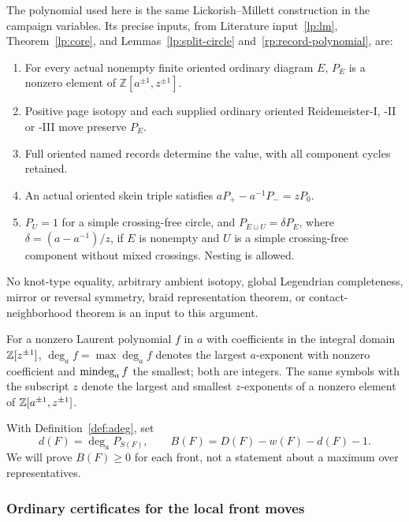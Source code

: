 The polynomial used here is the same Lickorish--Millett construction in
the campaign variables. Its precise inputs, from
Literature input~\ref{lp:lm}, Theorem~\ref{lp:core}, and
Lemmas~\ref{lp:split-circle} and~\ref{rp:record-polynomial}, are:
\begin{enumerate}
\item For every actual nonempty finite oriented ordinary diagram $E$,
  $P_E$ is a nonzero element of $\mathbb Z[a^{\pm1},z^{\pm1}]$.
\item Positive page isotopy and each supplied ordinary oriented
  Reidemeister-I, -II or -III move preserve $P_E$.
\item Full oriented named records determine the value, with all component
  cycles retained.
\item An actual oriented skein triple satisfies
  $aP_+-a^{-1}P_-=zP_0$.
\item $P_U=1$ for a simple crossing-free circle, and
  $P_{E\sqcup U}=\delta P_E$, where
  $\delta=(a-a^{-1})/z$, if $E$ is nonempty and $U$ is a simple
  crossing-free component without mixed crossings. Nesting is allowed.
\end{enumerate}
No knot-type equality, arbitrary ambient isotopy, global Legendrian
completeness, mirror or reversal symmetry, braid representation theorem,
or contact-neighborhood theorem is an input to this argument.

\begin{definition}[degrees in $a$]\label{def:adeg}
For a nonzero Laurent polynomial $f$ in $a$ with coefficients in the
integral domain $\mathbb Z[z^{\pm1}]$, $\deg_af=\max\deg_af$ denotes the largest
$a$-exponent with nonzero coefficient and $\operatorname{mindeg}_af$ the smallest; both
are integers. The same symbols with the subscript $z$ denote the largest and
smallest $z$-exponents of a nonzero element of $\mathbb Z[a^{\pm1},z^{\pm1}]$.
\end{definition}

With Definition~\ref{def:adeg}, set
\begin{equation}\label{ng:defect}
 d(F)=\deg_a P_{S(F)},\qquad
 B(F)=D(F)-w(F)-d(F)-1.
\end{equation}
We will prove $B(F)\geq0$ for each front, not a statement about a maximum
over representatives.

\subsubsection{Ordinary certificates for the local front moves}
\label{ng:local-certificates}

